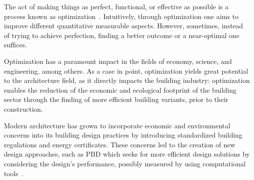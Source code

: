 \cleardoublepage
\label{chap:intro}
	
	The act of making things as perfect, functional, or effective as possible is a process known as optimization~\cite{MerriamWebster2017OptimizationDefinition}. Intuitively, through optimization one aims to improve different quantitative measurable aspects. However, sometimes, instead of trying to achieve perfection, finding a better outcome or a near-optimal one suffices. %
	
	Optimization has a paramount impact in the fields of economy, science, and engineering, among others. As a case in point, optimization yields great potential to the architecture field, as it directly impacts the building industry: optimization enables the reduction of the economic and ecological footprint of the building sector through the finding of more efficient building variants, prior to their construction. 
	
	Modern architecture has grown to incorporate economic and environmental concerns into its building design practices by introducing standardized building regulations and energy certificates. These concerns led to the creation of new design approaches, such as \ac{PBD} which seeks for more efficient design solutions by considering the design's performance, possibly measured by using computational tools~\cite{Oxman2006PBD}.
	
